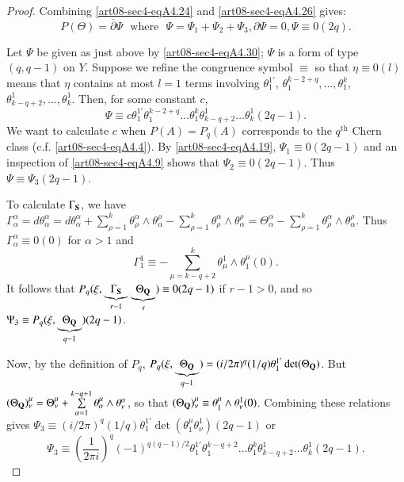 \begin{proof}
Combining \eqref{art08-sec4-eqA4.24} and \eqref{art08-sec4-eqA4.26} gives:
\begin{equation*}
P(\Theta)=\overline{\partial}\Psi \text{~ where~ } \Psi=\Psi_{1}+\Psi_{2}+\Psi_{3},\partial \Psi=0,\Psi\equiv 0(2q).\tag{A4.30}\label{art08-sec4-eqA4.30}
\end{equation*}

Let $\Psi$ be given as just above by \eqref{art08-sec4-eqA4.30}; $\Psi$ is a form of type $(q,q-1)$ on $Y$. Suppose we refine the congruence symbol $\equiv$ so that $\eta\equiv 0(l)$ means that $\eta$ contains at most $l=1$ terms involving $\theta^{1'}_{1}$, $\theta^{k-2+q}_{1},\ldots,\theta^{k}_{1}$, $\theta^{1}_{k-q+2},\ldots,\theta^{1}_{k}$. Then, for some constant $c$,
\begin{equation*}
\Psi \equiv c\theta^{1'}_{1}\theta^{k-2+q}_{1}\ldots\theta^{k}_{1}\theta^{1}_{k-q+2}\ldots\theta^{1}_{k}(2q-1).\tag{A4.31}\label{art08-sec4-eqA4.31}
\end{equation*}
We want to calculate $c$ when $P(A)=P_{q}(A)$ corresponds to the $q^{\text{th}}$ Chern class (c.f. \eqref{art08-sec4-eqA4.4}). By \eqref{art08-sec4-eqA4.19}, $\Psi_{1}\equiv 0(2q-1)$ and an inspection of \eqref{art08-sec4-eqA4.9} shows that $\Psi_{2}\equiv 0(2q-1)$. Thus $\Psi\equiv \Psi_{3}(2q-1)$.

To calculate $\Gamma_{\mathbf{S}}$, we have $\Gamma^{\alpha}_{\alpha}=d\theta^{\alpha}_{\alpha}=d\theta^{\alpha}_{\alpha}+\sum\limits^{k}_{\rho=1}\theta^{\alpha}_{\rho}\wedge \theta^{\rho}_{\alpha}-\sum\limits^{k}_{\rho=1}\theta^{\alpha}_{\rho}\wedge \theta^{\rho}_{\alpha}=\Theta^{\alpha}_{\alpha}-\sum\limits^{k}_{\rho=1}\theta^{\alpha}_{\rho}\wedge \theta^{\rho}_{\alpha}$. Thus $\Gamma^{\alpha}_{\alpha}\equiv 0(0)$ for $\alpha>1$ and 
$$
\Gamma^{1}_{1}\equiv -\sum\limits^{k}_{\mu=k-q+2}\theta^{1}_{\mu}\wedge \theta^{\mu}_{1}(0).
$$\pageoriginale
It follows that $P_{q}(\xi,\underbrace{\Gamma_{\mathbf{S}}}_{r-1}\underbrace{\Theta_{\mathbf{Q}}}_{s})\equiv 0(2q-1)$ if $r-1>0$, and so $\Psi_{3}\equiv P_{q}(\xi, \underbrace{\Theta_{\mathbf{Q}}}_{q-1})(2q-1)$.

Now, by the definition of $P_{q}$, $P_{q}(\xi,\underbrace{\Theta_{\mathbf{Q}}}_{q-1})=(i/2\pi)^{q}(1/q)\theta^{1'}_{1}\det(\Theta_{\mathbf{Q}})$. But $(\Theta_{\mathbf{Q}})^{\mu}_{\nu}=\Theta^{\mu}_{\nu}+\sum\limits^{k-q+1}_{\alpha=1}\theta^{\mu}_{\alpha}\wedge \theta^{\alpha}_{\nu}$, so that $(\Theta_{\mathbf{Q}})^{\mu}_{\nu}\equiv \theta^{\mu}_{1}\wedge\theta^{1}_{\nu}(0)$. Combining these relations gives $\Psi_{3}\equiv (i/2\pi)^{q}(1/q)\theta^{1'}_{1}\det (\theta^{\mu}_{1}\theta^{1}_{\nu})(2q-1)$ or 
\begin{equation*}
\Psi_{3}\equiv \left(\frac{1}{2\pi i}\right)^{q}(-1)^{q(q-1)/2}\theta^{1'}_{1}\theta^{k-q+2}_{1}\ldots\theta^{k}_{1}\theta^{1}_{k-q+2}\ldots\theta^{1}_{k}(2q-1).\tag{A4.32}\label{art08-sec4-eqA4.32}
\end{equation*}


\end{proof}
